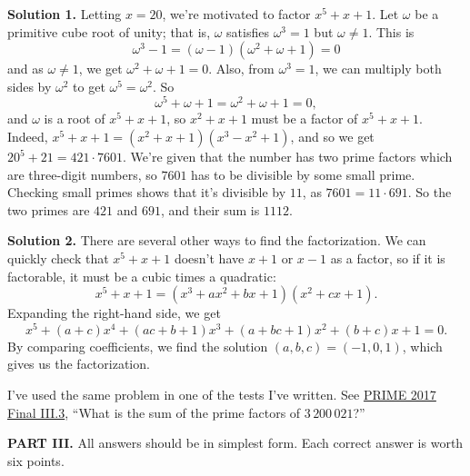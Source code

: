 \documentclass[11pt,paper=letter]{scrartcl}
\newcommand{\soln}[1]{{\sffamily \bfseries Solution #1.}\;}
\newcommand{\rem}[1]{{\small \sffamily \sansmath {\bfseries Remark.} #1}}
\begin{document}
\begin{enumerate}[align=left,leftmargin=*,resume]
\soln1 Letting $x = 20$, we're motivated to factor $x^5 + x + 1$. Let $\omega$ be a primitive cube root of unity; that is, $\omega$ satisfies $\omega^3 = 1$ but $\omega \ne 1$. This is $$\omega^3 - 1 = (\omega - 1)(\omega^2 + \omega + 1) = 0$$ and as $\omega \ne 1$, we get $\omega^2 + \omega + 1 = 0$. Also, from $\omega^3 = 1$, we can multiply both sides by $\omega^2$ to get $\omega^5 = \omega^2$. So $$\omega^5 + \omega + 1 = \omega^2 + \omega + 1 = 0,$$ and $\omega$ is a root of $x^5 + x + 1$, so $x^2 + x + 1$ must be a factor of $x^5 + x + 1$. Indeed, $x^5 + x + 1 = (x^2 + x + 1)(x^3 - x^2 + 1)$, and so we get $20^5 + 21 = 421 \cdot 7601$. We're given that the number has two prime factors which are three-digit numbers, so $7601$ has to be divisible by some small prime. Checking small primes shows that it's divisible by $11$, as $7601 = 11 \cdot 691$. So the two primes are $421$ and $691$, and their sum is $1112$.

\soln2 There are several other ways to find the factorization. We can quickly check that $x^5 + x + 1$ doesn't have $x+1$ or $x-1$ as a factor, so if it is factorable, it must be a cubic times a quadratic:
\[
  x^5 + x + 1 = (x^3 + ax^2 + bx + 1)(x^2 + cx + 1).
\]
Expanding the right-hand side, we get
\[
  x^5 + (a + c)x^4 + (ac + b + 1)x^3 + (a + bc + 1)x^2 + (b + c)x + 1 = 0.
\]
By comparing coefficients, we find the solution $(a, b, c) = (-1, 0, 1)$, which gives us the factorization.

\rem{I've used the same problem in one of the tests I've written. See \href{https://cjquines.com/files/prime2017/primefinal.pdf}{PRIME 2017 Final III.3{}}, ``What is the sum of the prime factors of $3\,200\,021$?''}

\end{enumerate}

\noindent\textbf{PART III.} All answers should be in simplest form. Each correct answer is worth six points.
\end{document}
